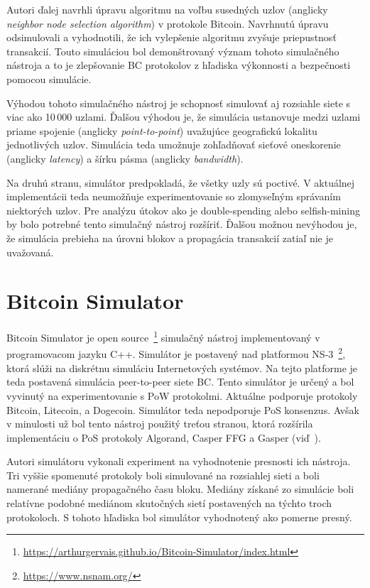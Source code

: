 Autori ďalej navrhli úpravu algoritmu na voľbu susedných uzlov (anglicky \textit{neighbor node selection algorithm}) v protokole Bitcoin. Navrhnutú úpravu odsimulovali a vyhodnotili, že ich vylepšenie algoritmu zvyšuje priepustnosť transakcií. Touto simuláciou bol demonštrovaný význam tohoto simulačného nástroja a to je zlepšovanie BC protokolov z hľadiska výkonnosti a bezpečnosti pomocou simulácie.~\cite{simblockWp}

Výhodou tohoto simulačného nástroj je schopnosť simulovať aj rozsiahle siete s viac ako 10\,000 uzlami. Ďalšou výhodou je, že simulácia ustanovuje medzi uzlami priame spojenie (anglicky \textit{point-to-point}) uvažujúce geografickú lokalitu jednotlivých uzlov. Simulácia teda umožnuje zohľadňovať sieťové oneskorenie (anglicky \textit{latency}) a šírku pásma (anglicky \textit{bandwidth}). 

Na druhú stranu, simulátor predpokladá, že všetky uzly sú poctivé. V aktuálnej implementácii teda neumožňuje experimentovanie so zlomyseľným správaním niektorých uzlov. Pre analýzu útokov ako je double-spending alebo selfish-mining by bolo potrebné tento simulačný nástroj rozšíriť. Ďalšou možnou nevýhodou je, že simulácia prebieha na úrovni blokov a propagácia transakcií zatiaľ nie je uvažovaná.~\cite{fanPerfEval}

\section{Bitcoin Simulator}

Bitcoin Simulator je open source~\footnote{\url{https://arthurgervais.github.io/Bitcoin-Simulator/index.html}} simulačný nástroj implementovaný v programovacom jazyku C++. Simulátor je postavený nad platformou NS-3~\footnote{\url{https://www.nsnam.org/}}, ktorá slúži na diskrétnu simuláciu Internetových systémov. Na tejto platforme je teda postavená simulácia peer-to-peer siete BC. Tento simulátor je určený a bol vyvinutý na experimentovanie s PoW protokolmi. Aktuálne podporuje protokoly Bitcoin, Litecoin, a Dogecoin. Simulátor teda nepodporuje PoS konsenzus. Avšak v minulosti už bol tento nástroj použitý treťou stranou, ktorá rozšírila implementáciu o PoS protokoly Algorand, Casper FFG a Gasper (viď~\cite{borcikDp}). 

Autori simulátoru vykonali experiment na vyhodnotenie presnosti ich nástroja. Tri vyššie spomenuté protokoly boli simulované na rozsiahlej sieti a boli namerané mediány propagačného času bloku. Mediány získané zo simulácie boli relatívne podobné mediánom skutočných sietí postavených na týchto troch protokoloch. S tohoto hľadiska bol simulátor vyhodnotený ako pomerne presný.~\cite{btcSimulatorWp}

